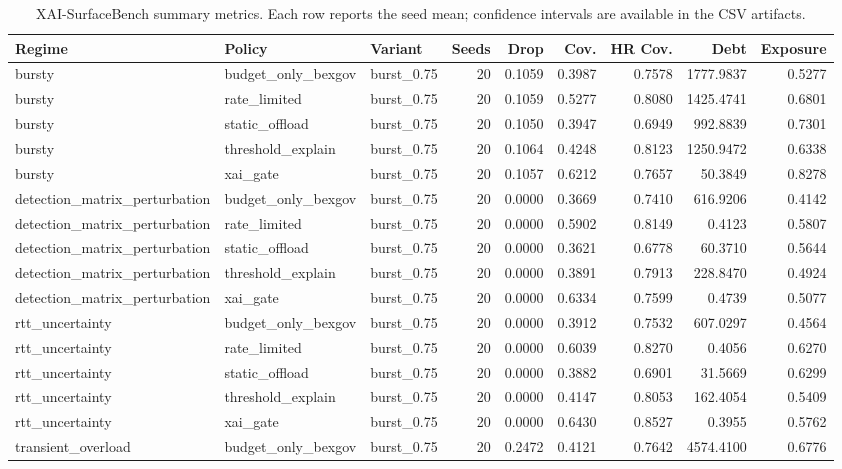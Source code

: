 \begin{table}[t]
\centering
\scriptsize
\caption{XAI-SurfaceBench summary metrics. Each row reports the seed mean; confidence intervals are available in the CSV artifacts.}
\begin{tabular}{lllrrrrrr}
\toprule
Regime & Policy & Variant & Seeds & Drop & Cov. & HR Cov. & Debt & Exposure \\
\midrule
bursty & budget\_only\_bexgov & burst\_0.75 & 20 & 0.1059 & 0.3987 & 0.7578 & 1777.9837 & 0.5277 \\
bursty & rate\_limited & burst\_0.75 & 20 & 0.1059 & 0.5277 & 0.8080 & 1425.4741 & 0.6801 \\
bursty & static\_offload & burst\_0.75 & 20 & 0.1050 & 0.3947 & 0.6949 & 992.8839 & 0.7301 \\
bursty & threshold\_explain & burst\_0.75 & 20 & 0.1064 & 0.4248 & 0.8123 & 1250.9472 & 0.6338 \\
bursty & xai\_gate & burst\_0.75 & 20 & 0.1057 & 0.6212 & 0.7657 & 50.3849 & 0.8278 \\
detection\_matrix\_perturbation & budget\_only\_bexgov & burst\_0.75 & 20 & 0.0000 & 0.3669 & 0.7410 & 616.9206 & 0.4142 \\
detection\_matrix\_perturbation & rate\_limited & burst\_0.75 & 20 & 0.0000 & 0.5902 & 0.8149 & 0.4123 & 0.5807 \\
detection\_matrix\_perturbation & static\_offload & burst\_0.75 & 20 & 0.0000 & 0.3621 & 0.6778 & 60.3710 & 0.5644 \\
detection\_matrix\_perturbation & threshold\_explain & burst\_0.75 & 20 & 0.0000 & 0.3891 & 0.7913 & 228.8470 & 0.4924 \\
detection\_matrix\_perturbation & xai\_gate & burst\_0.75 & 20 & 0.0000 & 0.6334 & 0.7599 & 0.4739 & 0.5077 \\
rtt\_uncertainty & budget\_only\_bexgov & burst\_0.75 & 20 & 0.0000 & 0.3912 & 0.7532 & 607.0297 & 0.4564 \\
rtt\_uncertainty & rate\_limited & burst\_0.75 & 20 & 0.0000 & 0.6039 & 0.8270 & 0.4056 & 0.6270 \\
rtt\_uncertainty & static\_offload & burst\_0.75 & 20 & 0.0000 & 0.3882 & 0.6901 & 31.5669 & 0.6299 \\
rtt\_uncertainty & threshold\_explain & burst\_0.75 & 20 & 0.0000 & 0.4147 & 0.8053 & 162.4054 & 0.5409 \\
rtt\_uncertainty & xai\_gate & burst\_0.75 & 20 & 0.0000 & 0.6430 & 0.8527 & 0.3955 & 0.5762 \\
transient\_overload & budget\_only\_bexgov & burst\_0.75 & 20 & 0.2472 & 0.4121 & 0.7642 & 4574.4100 & 0.6776 \\

\end{tabular}
\end{table}

